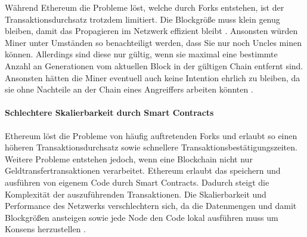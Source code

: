 Während Ethereum die Probleme löst, welche durch Forks entstehen, ist der Transaktionsdurchsatz trotzdem limitiert. Die Blockgröße muss klein genug bleiben, damit das Propagieren im Netzwerk effizient bleibt \cite{SchererPerformanceScalabilityBlockchain2017}. Ansonsten würden Miner unter Umständen so benachteiligt werden, dass Sie nur noch Uncles minen können. Allerdings sind diese nur gültig, wenn sie maximal eine bestimmte Anzahl an Generationen vom aktuellen Block in der gültigen Chain entfernt sind. Ansonsten hätten die Miner eventuell auch keine Intention ehrlich zu bleiben, da sie ohne Nachteile an der Chain eines Angreiffers arbeiten könnten \cite{EthereumWhitepaper2017}.


\paragraph{Schlechtere Skalierbarkeit durch Smart Contracts}
Ethereum löst die Probleme von häufig auftretenden Forks und erlaubt so einen höheren Transaktionsdurchsatz sowie schnellere Transaktionsbestätigungszeiten. Weitere Probleme entstehen jedoch, wenn eine Blockchain nicht nur Geldtransfertransaktionen verarbeitet. Ethereum erlaubt das speichern und ausführen von eigenem Code durch Smart Contracts. Dadurch steigt die Komplexität der auszuführenden Transaktionen. Die Skalierbarkeit und Performance des Netzwerks verschlechtern sich, da die Datenmengen und damit Blockgrößen ansteigen sowie jede Node den Code lokal ausführen muss um Konsens herzustellen \cite{SchererPerformanceScalabilityBlockchain2017}.


